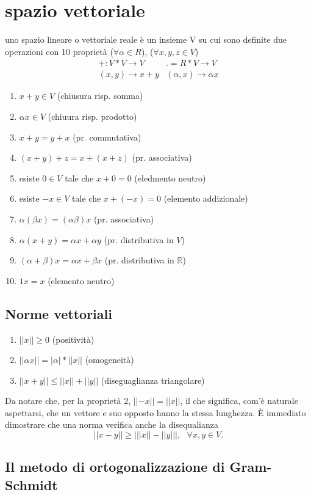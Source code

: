 \documentclass{book}
\newcommand{\abs}[1]{\lvert#1\rvert}
\begin{document}
\chapter{spazio vettoriale}
uno spazio lineare o vettoriale reale è un insieme V su cui sono definite due operazioni con 10 proprietà
($\forall \alpha \in R$), ($\forall x, y, z \in V$)
\begin{equation*}
  \begin{matrix}
    +:V*V\to V & .=R*V\to V\\
    (x,y) \to x + y & (\alpha,x) \to \alpha x
  \end{matrix}
\end{equation*}
\begin{enumerate}
    \item $x+y\in V$ (chiusura risp. somma)
    \item $\alpha x \in V$ (chiuura risp. prodotto)
    \item $x+y=y+x$ (pr. commutativa)
    \item $(x+y)+z=x+(x+z)$ (pr. associativa)
    \item esiste $0\in V$ tale che $x+0=0$ (eledmento neutro)
    \item esiste $-x \in V$ tale che $x+(-x)=0$ (elemento addizionale)
    \item $\alpha(\beta x)=(\alpha \beta) x$ (pr. associativa)
    \item $\alpha(x+y)=\alpha x+\alpha y$ (pr. distributiva in $V$)
    \item $(\alpha + \beta)x=\alpha x+\beta x$ (pr. distributiva in $\mathds{R}$)
    \item $1x=x$ (elemento neutro)
\end{enumerate}
\section{Norme vettoriali}
\begin{enumerate}
    \item $||x||\geq 0$ (positività)
    \item $||\alpha x||=|\alpha|*||x||$ (omogeneità)
    \item $||x+y||\leq||x||+||y||$ (diseguaglianza triangolare)
\end{enumerate}
Da notare che, per la proprietà 2, $\abs{\abs{-x}}=\abs{\abs{x}}$, il che significa, com'è naturale aspettarsi,
che un vettore e suo opposto hanno la stessa lunghezza. È immediato dimostrare che una norma verifica anche la
disequalianza
\begin{equation}
  \abs{|x-y|}\geq \abs{||x||-||y||},\text{ }\forall x,y\in V.
\end{equation}
\section{Il metodo di ortogonalizzazione di Gram-Schmidt}
\end{document}
